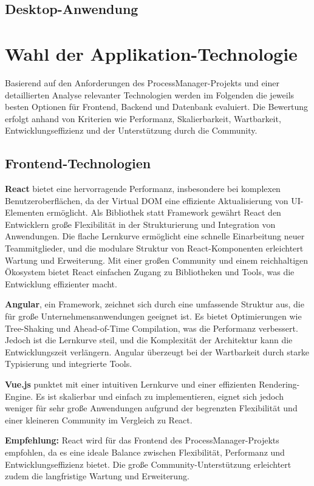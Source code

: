 \subsection*{Desktop-Anwendung}
\fi

\newpage
\section{Wahl der Applikation-Technologie}
Basierend auf den Anforderungen des ProcessManager-Projekts und einer detaillierten Analyse relevanter Technologien werden im Folgenden die jeweils besten Optionen für Frontend, Backend und Datenbank evaluiert. Die Bewertung erfolgt anhand von Kriterien wie Performanz, Skalierbarkeit, Wartbarkeit, Entwicklungseffizienz und der Unterstützung durch die Community.

\subsection{Frontend-Technologien}
\textbf{React} bietet eine hervorragende Performanz, insbesondere bei komplexen Benutzeroberflächen, da der Virtual DOM eine effiziente Aktualisierung von UI-Elementen ermöglicht. Als Bibliothek statt Framework gewährt React den Entwicklern große Flexibilität in der Strukturierung und Integration von Anwendungen. Die flache Lernkurve ermöglicht eine schnelle Einarbeitung neuer Teammitglieder, und die modulare Struktur von React-Komponenten erleichtert Wartung und Erweiterung. Mit einer großen Community und einem reichhaltigen Ökosystem bietet React einfachen Zugang zu Bibliotheken und Tools, was die Entwicklung effizienter macht.

\textbf{Angular}, ein Framework, zeichnet sich durch eine umfassende Struktur aus, die für große Unternehmensanwendungen geeignet ist. Es bietet Optimierungen wie Tree-Shaking und Ahead-of-Time Compilation, was die Performanz verbessert. Jedoch ist die Lernkurve steil, und die Komplexität der Architektur kann die Entwicklungszeit verlängern. Angular überzeugt bei der Wartbarkeit durch starke Typisierung und integrierte Tools.

\textbf{Vue.js} punktet mit einer intuitiven Lernkurve und einer effizienten Rendering-Engine. Es ist skalierbar und einfach zu implementieren, eignet sich jedoch weniger für sehr große Anwendungen aufgrund der begrenzten Flexibilität und einer kleineren Community im Vergleich zu React.

\textbf{Empfehlung:} React wird für das Frontend des ProcessManager-Projekts empfohlen, da es eine ideale Balance zwischen Flexibilität, Performanz und Entwicklungseffizienz bietet. Die große Community-Unterstützung erleichtert zudem die langfristige Wartung und Erweiterung.

